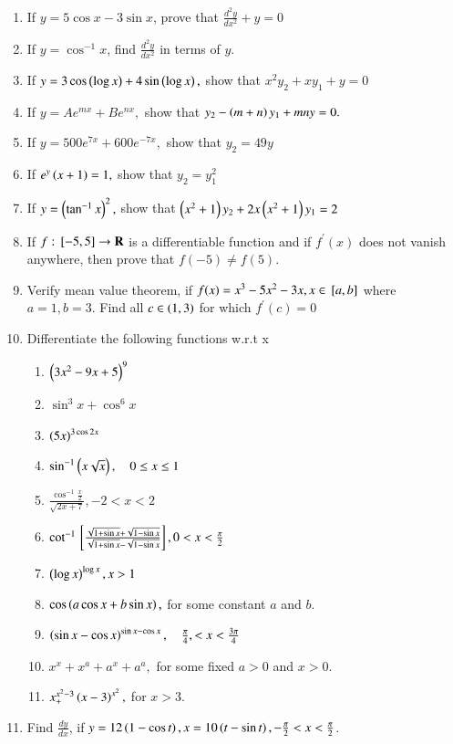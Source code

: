 \begin{enumerate}[label=\arabic*.,ref=\thesubsection.\theenumi]
\begin{enumerate}
\end{enumerate}
%
\item If $y = 5\cos x - 3 \sin x$, prove that 
$
\frac{d^2y}{dx^2} +y = 0
$
\item If $y = \cos^{-1}x$, find $\frac{d^2y}{dx^2}$ in terms of $y$.
\item If 
$
y = 3 \cos \left(\log x\right) + 4\sin\left(\log x\right), 
$
show that 
$
x^2y_2+xy_1+y = 0
$
\item If 
$
y = Ae^{mx} + Be^{nx}, 
$
show that 
$
y_2 - \left(m+n\right)y_1 +mny = 0.
$
\item If 
$
y = 500e^{7x} + 600 e^{-7x}, 
$
show  that 
$
y_2 = 49y
$
\item If 
$
e^y\left(x+1\right) = 1,
$
show that 
$
y_2 = y_1^2
$
\item If 
$
y = \left(\tan^{-1}x\right)^2, 
$
show that 
$
\left(x^2+1\right)y_2+2x\left(x^2+1\right)y_1 = 2
$
\item If $f: {}\left[-5,5\right]\to \mathbf{R}$ is a differentiable function and if $f^{\prime}(x)$ does not vanish anywhere, then prove that $f(-5) \ne f(5)$.
\item Verify mean value theorem, if 
$
f(x) = x^3-5x^2-3x, x \in {}\left[a,b\right]
$
where $a = 1, b = 3$.  Find all $c \in \left(1,3\right)$ for which $f^{\prime}(c) = 0$
%
\item Differentiate the following functions w.r.t x
%
\begin{enumerate}
\item 
$
\left(3x^2-9x+5\right)^9
$
\item 
$
\sin^3x+\cos^6x
$
\item 
$
\left(5x\right)^{3\cos2x}
$
\item 
$
\sin^{-1}\left(x\sqrt{x}\right), \quad 0 \le x \le 1
$
\item 
$
\frac{\cos^{-1}\frac{x}{2}}{\sqrt{2x+7}}, -2 < x < 2
$
\item 
$
\cot^{-1}{}\left[\frac{\sqrt{1+\sin x}+\sqrt{1-\sin x}}{\sqrt{1+\sin x}-\sqrt{1-\sin x}}\right], 0 < x < \frac{\pi}{2}
$
\item 
$
\left(\log x\right)^{\log x}, x > 1
$
\item 
$
\cos\left(a\cos x + b \sin x\right), 
$
for some constant $a$ and $b$.
\item 
$
\left(\sin x - \cos x\right)^{\sin x - \cos x}, \quad \frac{\pi}{4}, < x < \frac{3\pi}{4}
$
\item 
$
x^x+x^a+a^x+a^a,
$
for some fixed $a > 0$ and $x > 0$.
\item 
$
x^{x^2-3}_+\left(x-3\right)^{x^2}, 
$
for $x > 3$.
\end{enumerate}
\item Find $\frac{dy}{dx}$, if $y = 12\left(1-\cos t\right), x = 10\left(t-\sin t\right), -\frac{\pi}{2} < x < \frac{\pi}{2}$.

\end{enumerate}
